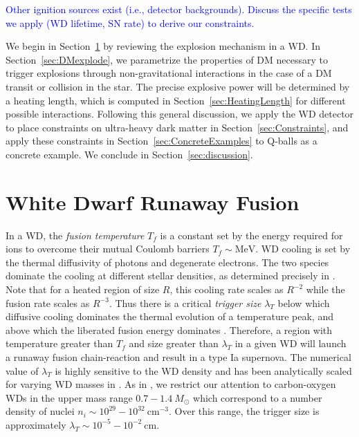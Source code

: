 \documentclass[twocolumn,showpacs,preprintnumbers,amsmath,amssymb,prd]{revtex4}
\newcommand{\MeV}{\text{MeV}}
\newcommand{\cm}{\text{cm}}
\begin{document}
\textcolor{blue}{Other ignition sources exist (i.e., detector backgrounds). Discuss the specific tests we apply (WD lifetime, SN rate) to derive our constraints.} 

We begin in Section~\ref{sec:Review} by reviewing the explosion mechanism in a WD. In Section~\ref{sec:DMexplode}, we parametrize the properties of DM necessary to trigger explosions through non-gravitational interactions in the case of a DM transit or collision in the star. The precise explosive power will be determined by a heating length, which is computed in Section~\ref{sec:HeatingLength} for different possible interactions. Following this general discussion, we apply the WD detector to place constraints on ultra-heavy dark matter in Section~\ref{sec:Constraints}, and apply these constraints in Section~\ref{sec:ConcreteExamples} to Q-balls as a concrete example. We conclude in Section~\ref{sec:discussion}.

\section{White Dwarf Runaway Fusion}
\label{sec:Review}
In a WD, the \emph{fusion temperature} $T_f$ is a constant set by the energy required for ions to overcome their mutual Coulomb barriers $T_f \sim \MeV$. WD cooling is set by the thermal diffusivity of photons and degenerate electrons. The two species dominate the cooling at different stellar densities, as determined precisely in \cite{Woosley}. Note that for a heated region of size $R$, this cooling rate scales as $R^{-2}$ while the fusion rate scales as $R^{-3}$. Thus there is a critical \emph{trigger size} $\lambda_T$ below which diffusive cooling dominates the thermal evolution of a temperature peak, and above which the liberated fusion energy dominates \cite{Woosley}. Therefore, a region with temperature greater than $T_f$ and size greater than $\lambda_T$ in a given WD will launch a runaway fusion chain-reaction and result in a type Ia supernova. The numerical value of $\lambda_T$ is highly sensitive to the WD density and has been analytically scaled for varying WD masses in \cite{Graham:2015apa}. As in \cite{Graham:2015apa}, we restrict our attention to carbon-oxygen WDs in the upper mass range $0.7 - 1.4 ~M_{\odot}$ which correspond to a number density of nuclei $n_i \sim 10^{29} - 10^{32} ~\cm^{-3}$. Over this range, the trigger size is approximately $\lambda_T \sim 10^{-5} - 10^{-2} ~\text{cm}$.
\end{document}
